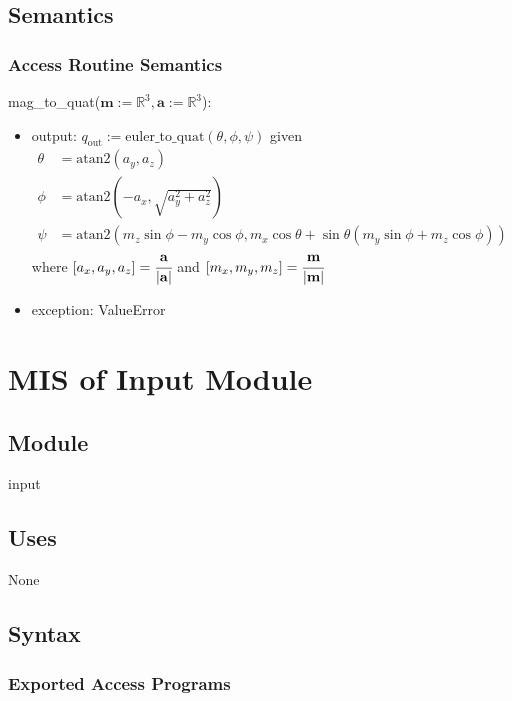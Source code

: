 \documentclass[12pt, titlepage]{article}
\begin{document}
\subsection{Semantics}

\subsubsection{Access Routine Semantics}

\noindent mag\_to\_quat($\mathbf{m}:=\mathbb{R}^3, \mathbf{a}:=\mathbb{R}^3$):
\begin{itemize}
\item output: $q_\text{out}:= \text{euler\_to\_quat}(\theta, \phi, \psi)$ given
\begin{align*}
  \theta &= \text{atan2}(a_y, a_z) \\
  \phi &= \text{atan2}(-a_x, \sqrt{a_y^2+a_z^2}) \\
  \psi &= \text{atan2}(m_z\sin\phi - m_y\cos\phi, m_x\cos\theta + \sin\theta(m_y\sin\phi + m_z\cos\phi))
\end{align*}
where $[a_x, a_y, a_z] = \cfrac{\mathbf{a}}{|\mathbf{a}|}$ and $[m_x, m_y, m_z] =
\cfrac{\mathbf{m}}{|\mathbf{m}|}$
\item exception: ValueError
\end{itemize}

\newpage

\section{MIS of Input Module} \label{ivm}

\subsection{Module}
input

\subsection{Uses}
None

\subsection{Syntax}

\subsubsection{Exported Access Programs}
\end{document}
